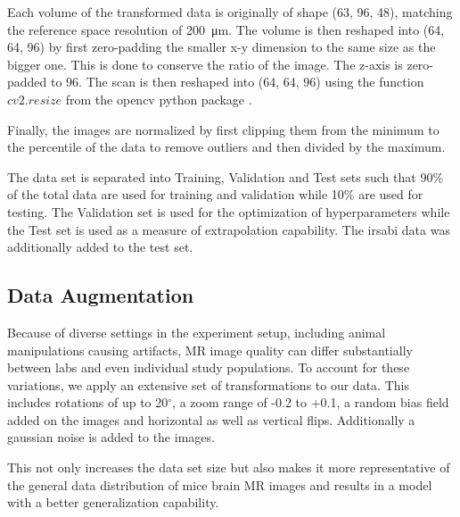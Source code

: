 Each volume of the transformed data is originally of shape (63, 96, 48), matching the reference space resolution of \SI{200}{\micro\metre}.
The volume is then reshaped into (64, 64, 96)
by first zero-padding the smaller x-y dimension to the same size as the bigger one.
This is done to conserve the ratio of the image.
The z-axis is zero-padded to 96.
The scan is then reshaped into (64, 64, 96) using the function \textcolor{mg}{\texttt{$cv2.resize$}} from the opencv python package \citep{noauthor_opencv-python_nodate}.

Finally, the images are normalized by first clipping them from the minimum to the  percentile of the data to remove outliers and then divided by the maximum.

The data set is separated into Training, Validation and Test sets such that 90\% of the total data are used for training and validation while 10\% are used for testing.
The Validation set is used for the optimization of hyperparameters while the Test set is used as a measure of extrapolation capability.
The irsabi data was additionally added to the test set.

\subsection{Data Augmentation} \label{Data Augmentation}

Because of diverse settings in the experiment setup, including animal manipulations causing artifacts, MR image quality can differ substantially between labs and even individual study populations.
To account for these variations, we apply an extensive set of transformations to our data.
This includes rotations of up to 20$^{\circ}$, a zoom range of -0.2 to +0.1, a random bias field added on the images and horizontal as well as vertical flips.
Additionally a gaussian noise is added to the images.

This not only increases the data set size but also makes it more representative of the general data distribution of mice brain MR images and results in a model with a better generalization capability.

